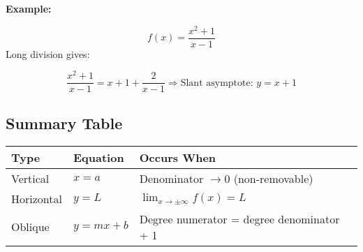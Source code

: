 \textbf{Example:}
\vspace{\baselineskip}

\[
    f(x) = \frac{x^2 + 1}{x - 1}
\]
Long division gives:

\[
    \frac{x^2 + 1}{x - 1} = x + 1 + \frac{2}{x - 1}
    \Rightarrow \text{Slant asymptote: } y = x + 1
\]

\subsection{Summary Table}

\begin{center}
    \begin{tabular}{|l|l|l|}
    \hline
    \textbf{Type} & \textbf{Equation} & \textbf{Occurs When} \\
    \hline
    Vertical      & \(x = a\)           & Denominator \(\to 0\) (non-removable) \\
    Horizontal    & \(y = L\)           & \(\lim_{x \to \pm \infty} f(x) = L\) \\
    Oblique       & \(y = mx + b\)      & Degree numerator = degree denominator + 1 \\
    \hline
    \end{tabular}
\end{center}